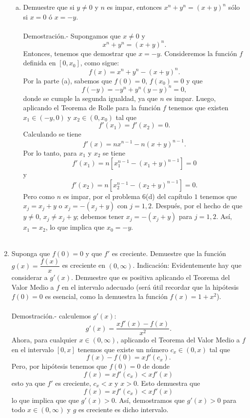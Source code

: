 \begin{enumerate}[\bfseries 1.]
\begin{enumerate}[(a)]
	    \item Demuestre que si $y\neq 0$ y $n$ es impar, entonces $x^n+y^n = (x+y)^n$ sólo si $x=0$ ó $x=-y$.\\\\
		Demostración.-\; Supongamos que $x\neq 0$ y 
		$$x^n+y^n=(x+y)^n.$$
		Entonces, tenemos que demostrar que $x=-y$. Consideremos la función $f$ definida en $[0,x_0]$, como sigue:
		$$f(x)=x^n+y^n-(x+y)^n.$$
		Por la parte (a), sabemos que $f(0)=0$, $f(x_0)=0$ y que
		$$f(-y)=-y^n+y^n(y-y)^n=0,$$
		donde se cumple la segunda igualdad, ya que $n$ es impar. Luego, aplicando el Teorema de Rolle para la función $f$ tenemos que existen $x_1\in (-y,0)$ y $x_2\in (0,x_0)$ tal que
		$$f'(x_1)=f'(x_2)=0.$$
		Calculando se tiene
		$$f'(x)=n x^{n-1}-n(x+y)^{n-1}.$$
		Por lo tanto, para $x_1$ y $x_2$ se tiene
		$$f'(x_1)=n\left[x_1^{n-1}-(x_1+y)^{n-1}\right]=0$$
		y
		$$f'(x_2)=n\left[x_2^{n-1}-(x_2+y)^{n-1}\right]=0.$$
		Pero como $n$ es impar, por el problema 6(d) del capítulo $1$ tenemos que $x_j=x_j+y$ o $x_j=-(x_j+y)$ con $j=1,2$. Después, por el hecho de que $y\neq 0$, $x_j\neq x_j+y$; debemos tener $x_j=-(x_j+y)$ para $j=1,2$. Así, $x_1=x_2$, lo que implica que $x_0=-y$.\\\\

	\end{enumerate}

    \item Suponga que $f(0)=0$ y que $f'$ es creciente. Demuestre que la función $g(x)=\dfrac{f(x)}{x}$ es creciente en $(0,\infty)$. Indicación: Evidentemente hay que considerar a $g'(x)$. Demuestre que es positiva aplicando el Teorema del Valor Medio a $f$ en el intervalo adecuado (será útil recordar que la hipótesis $f(0)=0$ es esencial, como la demuestra la función $f(x)=1+x^2$).\\\\
	Demostración.-\; calculemos $g'(x)$:
	$$g'(x)=\dfrac{xf'(x)-f(x)}{x^2}.$$
	Ahora, para cualquier $x\in (0,\infty)$, aplicando el Teorema del Valor Medio a $f$ en el intervalo $[0,x]$ tenemos que existe un número $c_x\in (0,x)$ tal que
	$$f(x)-f(0)=xf'(c_x).$$
	Pero, por hipótesis tenemos que $f(0)=0$ de donde
	$$f(x)=xf'(c_x)<xf'(x)$$
	esto ya que $f'$ es creciente, $c_x<x$ y $x>0$. Esto demuestra que 
	$$f(x)=xf'(c_x)<xf'(x)$$
	lo que implica que que $g'(x)>0$. Así, demostramos que $g'(x)>0$ para todo $x\in (0,\infty)$ y $g$ es creciente es dicho intervalo.\\\\ 


\end{enumerate}
